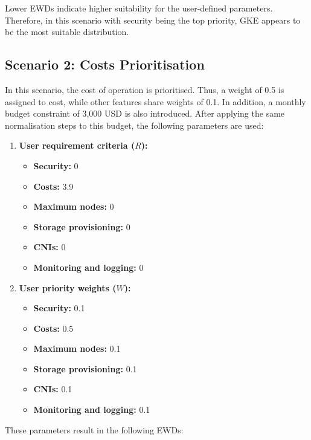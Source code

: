 Lower EWDs indicate higher suitability for the user-defined parameters. Therefore, in this scenario with security being the top priority, GKE appears to be the most suitable distribution.

\subsection{Scenario 2: Costs Prioritisation}

In this scenario, the cost of operation is prioritised. Thus, a weight of 0.5 is assigned to cost, while other features share weights of 0.1. In addition, a monthly budget constraint of 3,000 USD is also introduced. After applying the same normalisation steps to this budget, the following parameters are used:

\begin{enumerate}
\def\labelenumi{\arabic{enumi}.}
\tightlist
\item
  \textbf{User requirement criteria (\(R\)):}
    \begin{itemize}
  \tightlist
  \item
    \textbf{Security:} 0
  \item
    \textbf{Costs:} 3.9
  \item
    \textbf{Maximum nodes:} 0
  \item
    \textbf{Storage provisioning:} 0
  \item
    \textbf{CNIs:} 0
  \item
    \textbf{Monitoring and logging:} 0
  \end{itemize}
\item
  \textbf{User priority weights (\(W\)):}

  \begin{itemize}
  \tightlist
  \item
    \textbf{Security:} 0.1
  \item
    \textbf{Costs:} 0.5
  \item
    \textbf{Maximum nodes:} 0.1
  \item
    \textbf{Storage provisioning:} 0.1
  \item
    \textbf{CNIs:} 0.1
  \item
    \textbf{Monitoring and logging:} 0.1
  \end{itemize}
\end{enumerate}

These parameters result in the following EWDs:

